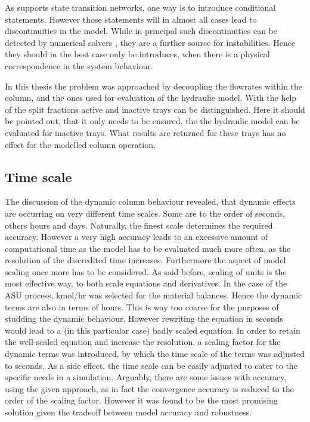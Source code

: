         As \gproms supports state transition networks, one way is to introduce conditional statements. However
        those statements will in almost all cases lead to discontinuities in the model. While in principal such
        discontinuities can be detected by numerical solvers \cite{Pantelides.2003}, they are a further source
        for instabilities. Hence they should in the best case only be introduces, when there is a physical correspondence
        in the system behaviour.

        In this thesis the problem was approached by decoupling the flowrates within the column, and the ones used for evaluation
        of the hydraulic model. With the help of the split fractions active and inactive trays can be distinguished.
        Here it should be pointed out, that it only needs to be ensured, the the hydraulic model can be evaluated for inactive trays.
        What results are returned for these trays has no effect for the modelled column operation.
        
        \subsection{Time scale}
        The discussion of the dynamic column behaviour revealed, that dynamic effects are occurring on very different time scales. 
        Some are to the order of seconds, others hours and days. Naturally, the finest scale determines the required accuracy. 
        However a very high accuracy leads to an excessive amount of computational time as the model has to be evaluated 
        much more often, as the resolution of the discredited time increases. Furthermore the aspect of model scaling 
        once more has to be considered. As said before, scaling of units is the most effective way, to both scale equations 
        and derivatives. In the case of the ASU process, kmol/hr was selected for the material balances. Hence the 
        dynamic terms are also in terms of hours. This is way too coarse for the purposes of studding the dynamic 
        behaviour. However rewriting the equation in seconds would lead to a (in this particular case) badly scaled equation. 
        In order to retain the well-scaled equation and increase the resolution, a scaling factor for the dynamic terms was 
        introduced, by which the time scale of the terms was adjusted to seconds. As a side effect, the time scale can be 
        easily adjusted to cater to the specific needs in a simulation. Arguably, there are some issues with accuracy, using the 
        given approach, as in fact the convergence accuracy is reduced to the order of the scaling factor. However it was 
        found to be the most promising solution given the tradeoff between model accuracy and robustness. 
